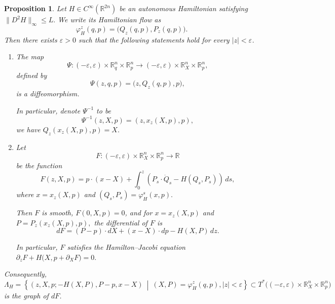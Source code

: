 \documentclass[11pt]{amsart}
\numberwithin{equation}{section}
\theoremstyle{plain}
\newtheorem{Prop}[prop]{Proposition}
\theoremstyle{definition}
\theoremstyle{remark}
\newcommand{\bR} { {\mathbb{R}}}
\begin{document}
\begin{Prop}\label{prop: existence of function F}Let
$
H\in C^\infty(\mathbb{R}^{2n})
$
be an autonomous Hamiltonian satisfying $
\|D^2H\|_\infty\leq L.
$ We write its Hamiltonian flow as
\[
\varphi_H^z(q,p)
=
\bigl(Q_z(q,p),P_z(q,p)\bigr).
\]
Then there exists $\varepsilon>0$ such that the following statements hold for every
$|z|<\varepsilon$.

\begin{enumerate}[fullwidth]
\item
The map
\[
{\Psi}:
(-\varepsilon,\varepsilon)\times \mathbb{R}^{n}_q\times \bR^n_p
\longrightarrow
(-\varepsilon,\varepsilon)\times \mathbb{R}^{n}_X\times \bR^n_p,
\]
defined by
\[
{\Psi}(z,q,p)
=
\bigl(z,Q_z(q,p),p\bigr),
\]
is a diffeomorphism. 

In particular, denote ${\Psi}^{-1}$ to be
\[{\Psi}^{-1}(z,X,p)=(z,x_z(X,p),p),\]
we have $Q_z(x_z(X,p),p)=X.$

\item Let 
\[
F:
(-\varepsilon,\varepsilon)
\times \mathbb{R}^n_X
\times \mathbb{R}^n_p
\longrightarrow \mathbb{R}
\]
be the function
\[
F(z,X,p)
=
p\cdot(x-X)
+
\int_0^z
\left(
P_s\cdot\dot Q_s-H(Q_s,P_s)
\right)\,ds,
\]
where
\(
x=x_z(X,p)
\) and \(
(Q_s,P_s)=\varphi_H^s(x,p).
\)

Then $F$ is smooth, $
F(0,X,p)=0$, and for
\(
x=x_z(X,p)
\) and \(
P=P_z(x_z(X,p),p),
\) 
the differential of $F$ is
\[
dF
=
(P-p)\cdot dX
+
(x-X)\cdot dp
-
H(X,P)\,dz.
\]

In particular, $F$ satisfies the Hamilton--Jacobi equation 
$
\partial_zF
+
H\bigl(X,p+\partial_XF\bigr)
=
0.
$
\end{enumerate}

Consequently, 
\[
\Lambda_H
=
\left\{
\left(
z,X,p;
-H(X,P),P-p,x-X
\right)
\ \middle|\
(X,P)=\varphi_H^z(q,p), |z|<\varepsilon
\right\}\subset T^*\bigl(
(-\varepsilon,\varepsilon)
\times \mathbb{R}^n_X
\times \mathbb{R}^n_p
\bigr)
\]
is the graph of $dF$.
\end{Prop}
\end{document}
